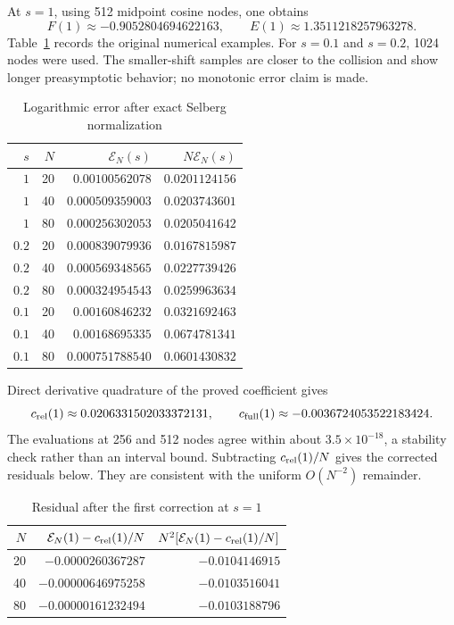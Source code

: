 \documentclass[11pt,a4paper]{article}
\numberwithin{equation}{section}
\theoremstyle{remark}\newtheorem{remark}[theorem]{Remark}
\begin{document}
At $s=1$, using 512 midpoint cosine nodes, one obtains
\[
 F(1)\approx-0.9052804694622163,\qquad
 E(1)\approx1.3511218257963278.
\]
Table~\ref{psh:tab:errors} records the original numerical examples. For
$s=0.1$ and $s=0.2$, 1024 nodes were used. The smaller-shift samples
are closer to the collision and show longer preasymptotic behavior;
no monotonic error claim is made.
\begin{table}[htbp]\centering
\caption{Logarithmic error after exact Selberg normalization}
\label{psh:tab:errors}
\begin{tabular}{@{}rrrr@{}}\toprule
$s$ & $N$ & $\mathcal E_N(s)$ & $N\mathcal E_N(s)$\\\midrule
$1$ & 20 & $0.00100562078$ & $0.0201124156$\\
$1$ & 40 & $0.000509359003$ & $0.0203743601$\\
$1$ & 80 & $0.000256302053$ & $0.0205041642$\\\addlinespace
$0.2$ & 20 & $0.000839079936$ & $0.0167815987$\\
$0.2$ & 40 & $0.000569348565$ & $0.0227739426$\\
$0.2$ & 80 & $0.000324954543$ & $0.0259963634$\\\addlinespace
$0.1$ & 20 & $0.00160846232$ & $0.0321692463$\\
$0.1$ & 40 & $0.00168695335$ & $0.0674781341$\\
$0.1$ & 80 & $0.000751788540$ & $0.0601430832$\\\bottomrule
\end{tabular}
\end{table}

Direct derivative quadrature of the proved coefficient gives
\[
 c_{\rm rel}(1)\approx0.0206331502033372131,\qquad
 c_{\rm full}(1)\approx-0.0036724053522183424.
\]
The evaluations at 256 and 512 nodes agree within about
$3.5\times10^{-18}$, a stability check rather than an interval bound.
Subtracting $c_{\rm rel}(1)/N$ gives the corrected residuals below.
They are consistent with the uniform $O(N^{-2})$ remainder.
\begin{table}[htbp]\centering
\caption{Residual after the first correction at $s=1$}
\begin{tabular}{@{}rrr@{}}\toprule
$N$ & $\mathcal E_N(1)-c_{\rm rel}(1)/N$ &
$N^2[\mathcal E_N(1)-c_{\rm rel}(1)/N]$\\\midrule
20 & $-0.0000260367287$ & $-0.0104146915$\\
40 & $-0.00000646975258$ & $-0.0103516041$\\
80 & $-0.00000161232494$ & $-0.0103188796$\\\bottomrule
\end{tabular}
\end{table}
\end{document}
